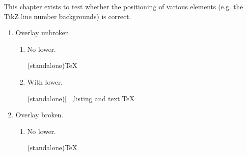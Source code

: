 This chapter exists to test whether the positioning of various elements (e.g. the TikZ line number backgrounds) is correct.
\begin{enumerate}
    \item Overlay unbroken.
    \begin{enumerate}
        \item No lower.
        \begin{code}(standalone){\TeX}
            
        \end{code}
        \item With lower.
        \begin{code}(standalone)[=,listing and text]{\TeX}
            
        \end{code}
    \end{enumerate}
    \item Overlay broken.
    \begin{enumerate}
        \item No lower.
        \begin{code}(standalone){\TeX}



















































\end{code}
\end{enumerate}
\end{enumerate}
